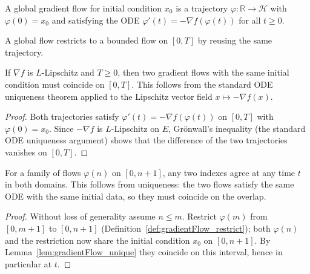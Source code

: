 \begin{definition}
  \label{def:GradientFlowGlobal}
  \leanok{}
  \uses{}
  A global gradient flow for initial condition $x_0$ is a trajectory $\varphi: \mathbb{R}\to\mathcal{H}$
  with $\varphi(0) = x_0$ and satisfying the ODE $\varphi'(t) = -\nabla f(\varphi(t))$ for all $t \ge 0$.
\end{definition}

\begin{definition}
  \label{def:GradientFlowGlobal.restrict}
  \leanok{}
  A global flow restricts to a bounded flow on $[0,T]$ by reusing the same trajectory.
\end{definition}

\begin{lemma}
  \label{lem:gradientFlow_unique}
  \leanok{}
  If $\nabla f$ is $L$-Lipschitz and $T\ge 0$, then two gradient flows with the same initial condition
  must coincide on $[0,T]$.  This follows from the standard ODE uniqueness theorem applied to the Lipschitz vector field $x \mapsto -\nabla f(x)$.
\end{lemma}
\begin{proof}
  \leanok{}
  Both trajectories satisfy $\varphi'(t)=-\nabla f(\varphi(t))$ on $[0,T]$ with $\varphi(0)=x_0$.
  Since $-\nabla f$ is $L$-Lipschitz on $E$, Gr\"onwall's inequality (the standard ODE uniqueness
  argument) shows that the difference of the two trajectories vanishes on $[0,T]$.
\end{proof}

\begin{lemma}
  \label{lem:flows_consistent_at}
  \leanok{}
  For a family of flows $\varphi(n)$ on $[0,n+1]$, any two indexes agree at any time $t$ in both domains.
  This follows from uniqueness: the two flows satisfy the same ODE with the same initial data,
  so they must coincide on the overlap.
\end{lemma}
\begin{proof}
  \leanok{}
  Without loss of generality assume $n\le m$. Restrict $\varphi(m)$ from $[0,m+1]$ to $[0,n+1]$
  (Definition~\ref{def:gradientFlow_restrict}); both $\varphi(n)$ and the restriction now share the
  initial condition $x_0$ on $[0,n+1]$. By Lemma~\ref{lem:gradientFlow_unique} they coincide on this
  interval, hence in particular at $t$.
\end{proof}

